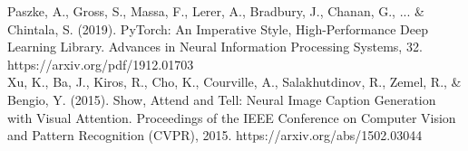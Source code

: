 \documentclass{article}
\begin{document}
\noindent
[5] Paszke, A., Gross, S., Massa, F., Lerer, A., Bradbury, J., Chanan, G., ... \& Chintala, S. (2019). PyTorch: An Imperative Style, High-Performance Deep Learning Library. Advances in Neural Information Processing Systems, 32. \\ https://arxiv.org/pdf/1912.01703\\

\noindent
[6] Xu, K., Ba, J., Kiros, R., Cho, K., Courville, A., Salakhutdinov, R., Zemel, R., \& Bengio, Y. (2015). Show, Attend and Tell: Neural Image Caption Generation with Visual Attention. Proceedings of the IEEE Conference on Computer Vision and Pattern Recognition (CVPR), 2015.
https://arxiv.org/abs/1502.03044
\end{document}
